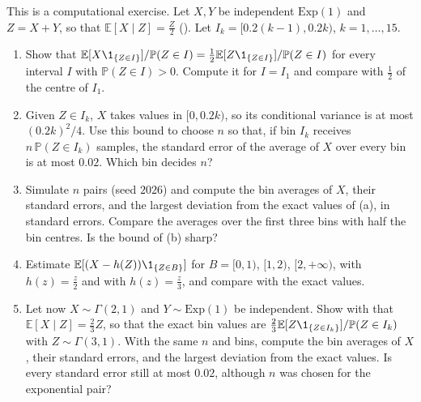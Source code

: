 \begin{exercise}\label{ex:ce-binning}
\medium This is a computational exercise. Let $X,Y$ be independent $\mathrm{Exp}(1)$ and $Z=X+Y$,
so that $\mathbb E[X\mid Z]=\frac Z2$ (). Let
$I_k=[0.2(k-1),0.2k)$, $k=1,\dots,15$.
\begin{enumerate}[label=(\alph*)]
  \item Show that $\mathbb E[X\1_{\{Z\in I\}}]/\mathbb P(Z\in I)=\frac12\mathbb E[Z\1_{\{Z\in I\}}]/\mathbb P(Z\in I)$
    for every interval $I$ with $\mathbb P(Z\in I)>0$. Compute it for $I=I_1$ and compare with
    $\frac12$ of the centre of $I_1$.
  \item Given $Z\in I_k$, $X$ takes values in $[0,0.2k)$, so its conditional variance is at most
    $(0.2k)^2/4$. Use this bound to choose $n$ so that, if bin $I_k$ receives
    $n\,\mathbb P(Z\in I_k)$ samples, the standard error of the average of $X$ over every bin is
    at most $0.02$. Which bin decides $n$?
  \item Simulate $n$ pairs (seed $2026$) and compute the bin averages of $X$, their standard
    errors, and the largest deviation from the exact values of (a), in standard errors. Compare
    the averages over the first three bins with half the bin centres. Is the bound of (b)
    sharp?
  \item Estimate $\mathbb E[(X-h(Z))\1_{\{Z\in B\}}]$ for $B=[0,1)$, $[1,2)$, $[2,+\infty)$, with
    $h(z)=\frac z2$ and with $h(z)=\frac z3$, and compare with the exact values.
  \item Let now $X\sim\Gamma(2,1)$ and $Y\sim\mathrm{Exp}(1)$ be independent. Show with
     that $\mathbb E[X\mid Z]=\frac23Z$, so that the exact bin values are
    $\frac23\mathbb E[Z\1_{\{Z\in I_k\}}]/\mathbb P(Z\in I_k)$ with $Z\sim\Gamma(3,1)$. With the same $n$
    and bins, compute the bin averages of $X$, their standard errors, and the largest deviation
    from the exact values. Is every standard error still at most $0.02$, although $n$ was chosen
    for the exponential pair?
\end{enumerate}
\end{exercise}

